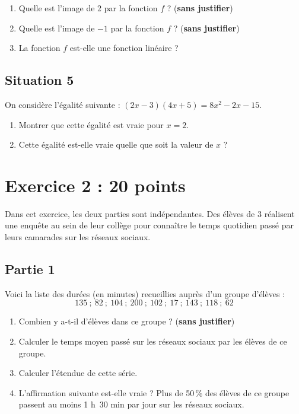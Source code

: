 \documentclass[11pt]{article}
\begin{document}
\medskip

\begin{enumerate}
\item Quelle est l'image de 2 par la fonction $f$ ? (\textbf{sans justifier})
\item Quelle est l'image de $- 1$ par la fonction $f$ ? (\textbf{sans justifier})
\item La fonction $f$ est-elle une fonction linéaire ?
\end{enumerate}

\subsection*{Situation 5}

On considère l'égalité suivante : $(2x - 3)(4x + 5) = 8x^2 - 2x - 15$.

\begin{enumerate}
\item Montrer que cette égalité est vraie pour $x = 2$.
\item Cette égalité est-elle vraie quelle que soit la valeur de $x$ ?
\end{enumerate}

\section*{Exercice 2 : \hfill 20 points}

Dans cet exercice, les deux parties sont indépendantes. Des élèves de 3 réalisent une enquête au sein de leur collège pour connaître le temps quotidien passé par leurs camarades sur les réseaux sociaux.

\subsection*{Partie 1}
Voici la liste des durées (en minutes) recueillies auprès d'un groupe d'élèves :
\[135~;~82~;~104~;~200~;~102~;~17~;~143~;~118~;~62\]

\begin{enumerate}
\item Combien y a-t-il d'élèves dans ce groupe ? (\textbf{sans justifier})
\item Calculer le temps moyen passé sur les réseaux sociaux par les élèves de ce groupe.
\item Calculer l'étendue de cette série.
\item L'affirmation suivante est-elle vraie ? \og Plus de 50\,\% des élèves de ce groupe passent au moins 1 h~30 min par jour sur les réseaux sociaux. \fg{}
\end{enumerate}
\end{document}
